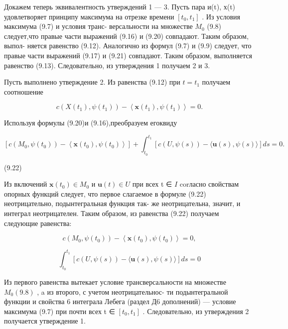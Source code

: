 \documentclass[8pt]{extarticle}
\begin{document}
Докажем теперь эквивалентность утверждений 1 — 3. Пусть пара и(t), х(t) удовлетворяет принципу максимума на отрезке времени \(\left\lbrack  {{t}_{0},{t}_{1}}\right\rbrack\) . Из условия максимума (9.7) и условия транс- версальности на множестве \({M}_{0}\) (9.8) следует,что правые части выражений (9.16) и (9.20) совпадают. Таким образом, выпол- няется равенство (9.12). Аналогично из формул (9.7) и (9.9) следует, что правые части выражений (9.17) и (9.21) совпадают. Таким образом, выполняется равенство (9.13). Следовательно, из утверждения 1 получаем 2 и 3.

Пусть выполнено утверждение 2. Из равенства (9.12) при \(t = {t}_{1}\) получаем соотношение

\[
c\left( {X\left( {t}_{1}\right) ,\psi \left( {t}_{1}\right) }\right)  - \left\langle  {\mathbf{x}\left( {t}_{1}\right) ,\psi \left( {t}_{1}\right) }\right\rangle   = 0.
\]

Используя формулы (9.20)и (9.16),преобразуем егоквиду

\[
\left\lbrack  {c\left( {{M}_{0},\psi \left( {t}_{0}\right) }\right)  - \left\langle  {\mathbf{x}\left( {t}_{0}\right) ,\psi \left( {t}_{0}\right) }\right\rangle  }\right\rbrack   + {\int }_{{t}_{0}}^{{t}_{1}}\left\lbrack  {c\left( {U,\psi \left( s\right) }\right)  - \langle \mathbf{u}\left( s\right) ,\psi \left( s\right) \rangle }\right\rbrack  {ds} = 0.
\]

(9.22)

Из включений \(\mathbf{x}\left( {t}_{0}\right)  \in  {M}_{0}\) и \(\mathbf{u}\left( t\right)  \in  U\) при всех t ∈ \(I\) corласно свойствам опорных функций следует, что первое слагаемое в формуле (9.22) неотрицательно, подынтегральная функция так- же неотрицательна, значит, и интеграл неотрицателен. Таким образом, из равенства (9.22) получаем следующие равенства:

\[
c\left( {{M}_{0},\psi \left( {t}_{0}\right) }\right)  - \left\langle  {\mathbf{x}\left( {t}_{0}\right) ,\psi \left( {t}_{0}\right) }\right\rangle   = 0,
\]

\[
{\int }_{{t}_{0}}^{{t}_{1}}\left\lbrack  {c\left( {U,\psi \left( s\right) }\right) -\langle \mathbf{u}\left( s\right) ,\psi \left( s\right) \rangle }\right\rbrack  {ds} = 0
\]

Из первого равенства вытекает условие трансверсальности на множестве \({M}_{0}\left( {9.8}\right)\) , a из второго, с учетом неотрицательнос- ти подынтегральной функции и свойства 6 интеграла Лебега (раздел Д6 дополнений) — условие максимума (9.7) при почти всех t ∈ \(\left\lbrack  {{t}_{0},{t}_{1}}\right\rbrack\) . Следовательно, из утверждения 2 получается утверждение 1.
\end{document}
